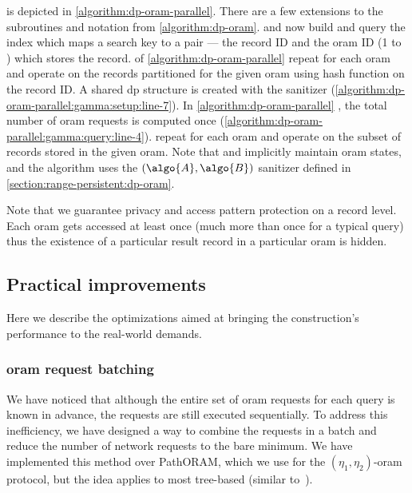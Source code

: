 		\protocolGamma{} is depicted in \cref{algorithm:dp-oram-parallel}.
		There are a few extensions to the subroutines and notation from \cref{algorithm:dp-oram}.
		 and  now build and query the index which maps a search key to a pair --- the record ID and the \acrshort{oram} ID (1 to \oramsNumber{}) which stores the record.
		 of \cref{algorithm:dp-oram-parallel} \protocolSetup{} repeat for each \acrshort{oram} and operate on the records partitioned for the given \acrshort{oram} using hash function  on the record ID\@.
		A shared \acrshort{dp} structure is created with the sanitizer  (\cref{algorithm:dp-oram-parallel:gamma:setup:line-7}).
		In \cref{algorithm:dp-oram-parallel} \protocolQuery{}, the total number of \acrshort{oram} requests is computed once (\cref{algorithm:dp-oram-parallel:gamma:query:line-4}).
		 repeat for each \acrshort{oram} and operate on the subset of records stored in the given \acrshort{oram}.
		Note that \user{} and \server{} implicitly maintain \oramsNumber{} \acrshort{oram} states, and the algorithm uses the $(\algo{A}, \algo{B})$ sanitizer defined in \cref{section:range-persistent:dp-oram}.

		Note that we guarantee privacy and access pattern protection on a record level.
		Each \acrshort{oram} gets accessed at least once (much more than once for a typical query) thus the existence of a particular result record in a particular \acrshort{oram} is hidden.

	\subsection{Practical improvements}\label{section:range-persistent:dp-improvements}

		Here we describe the optimizations aimed at bringing the construction's performance to the real-world demands.

		\subsubsection{\acrshort{oram} request batching}\label{section:range-persistent:dp-improvements:oram-batching}

			We have noticed that although the entire set of \acrshort{oram} requests for each query is known in advance, the requests are still executed sequentially.
			To address this inefficiency, we have designed a way to combine the requests in a batch and reduce the number of network requests to the bare minimum.
			We have implemented this method over PathORAM, which we use for the $(\eta_1, \eta_2)$-\acrshort{oram} protocol, but the idea applies to most tree-based  (similar to~\cite{parallel-oram-improved}).

